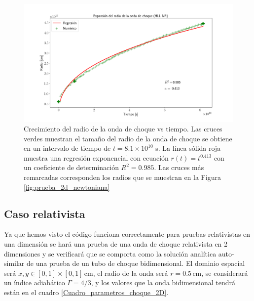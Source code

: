 \documentclass[12pt,a4paper]{book}
\begin{document}
\begin{figure}
  \centering
  \includegraphics[width=1\textwidth]{./Figuras/verificacion_del_codigo/prueba_2d_newtoniana/Expansion_HLL_NR_res_1000.png}
    \caption{Crecimiento del radio de la onda de choque vs tiempo. Las cruces verdes muestran el tamaño del radio de la onda de choque se obtiene en un intervalo de tiempo de $t=8.1 \times 10^{10}$ s.
    La línea sólida roja muestra una regresión exponencial con ecuación $r(t) = t^{0.413}$ con un coeficiente de determinación $R^2= 0.985$. Las cruces más remarcadas corresponden los radios que se muestran en la Figura 
    \ref{fig:prueba_2d_newtoniana}}
    \label{fig:Expansion_HLL_NR}
\end{figure}






\subsection{Caso relativista}
Ya que hemos visto el código funciona correctamente para pruebas relativistas en una dimensión se hará una prueba de una onda de choque relativista en 2 dimensiones y se verificará que se comporta como la solución 
analítica auto-similar de una prueba de un tubo de choque bidimensional. El dominio espacial será $x, y \in [0,1]\times[0,1] \, \text{cm}$, el radio de la onda será $r = 0.5 \, \text{cm}$, se considerará un índice 
adiabático $\Gamma = 4/3$, y los valores que la onda bidimensional tendrá están en el cuadro \ref{Cuadro_parametros_choque_2D}. 
\end{document}
